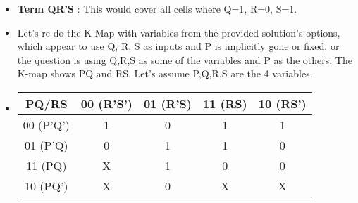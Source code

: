\documentclass{article}
\begin{document}
\begin{itemize}
\begin{itemize}
\begin{enumerate}
\begin{itemize}
            \item \textbf{Term QR'S} : This would cover all cells where Q=1, R=0, S=1.
            \item Let's re-do the K-Map with variables from the provided solution's options, which appear to use Q, R, S as inputs and P is implicitly gone or fixed, or the question is using Q,R,S as some of the variables and P as the others. The K-map shows PQ and RS. Let's assume P,Q,R,S are the 4 variables.
            \item \begin{tabular}{|c|c|c|c|c|} \\ \hline
PQ/RS & 00 (R'S') & 01 (R'S) & 11 (RS) & 10 (RS') \\ \hline

 00 (P'Q') & 1 & 0 & 1 & 1 \\ 01 (P'Q) & 0 & 1 & 1 & 0 \\ 11 (PQ) & X & 1 & 0 & 0 \\ 10 (PQ') & X & 0 & X & X \\ \hline

\end{tabular}



\end{itemize}
\end{enumerate}
\end{itemize}
\end{itemize}
\end{document}
